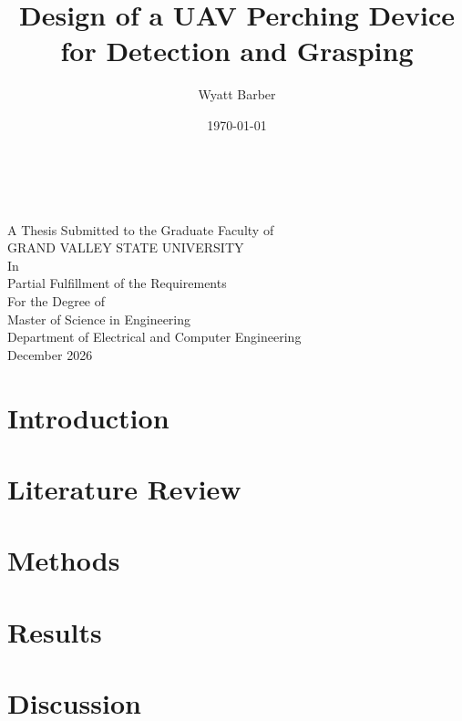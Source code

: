 \documentclass{article}
\makeatletter
\renewcommand{\maketitle}{%
    \begin{titlepage}  
        \begin{center}
            { \huge \@title}\\
            \vspace{\baselineskip}
            \@author\\
            \vspace{\baselineskip}\vspace{\baselineskip}\vspace{\baselineskip}\vspace{\baselineskip}
            \vspace{\baselineskip}\vspace{\baselineskip}\vspace{\baselineskip}\vspace{\baselineskip}
            \vspace{\baselineskip}
            A Thesis Submitted to the Graduate Faculty of\\
            \vspace{\baselineskip}
            GRAND VALLEY STATE UNIVERSITY\\
            \vspace{\baselineskip}
            In\\
            \vspace{\baselineskip}
            Partial Fulfillment of the Requirements \\
            \vspace{\baselineskip}
            For the Degree of \\
            \vspace{\baselineskip}
            Master of Science in Engineering \\             
            \vspace{\baselineskip}\vspace{\baselineskip}\vspace{\baselineskip}\vspace{\baselineskip}
            Department of Electrical and Computer Engineering \\
            \vspace{\baselineskip}\vspace{\baselineskip}\vspace{\baselineskip}\vspace{\baselineskip}
            \vspace{\baselineskip}\vspace{\baselineskip}\vspace{\baselineskip}\vspace{\baselineskip}
            December 2026\\
        \end{center}
    \end{titlepage}
}
\makeatother
\begin{document}
\title{Design of a UAV Perching Device for Detection and Grasping}

\author{Wyatt Barber}
\date{\today}

\maketitle



\setcounter{page}{2}
\begin{doublespace}




\end{doublespace}


\makeatletter
{}
\makeatother


\listoffigures
{}
\listoftables

\begin{doublespace}

\section{Introduction}



\section{Literature Review}


\section{Methods}







\section{Results}






\section{Discussion}




    
\end{doublespace}
\end{document}
